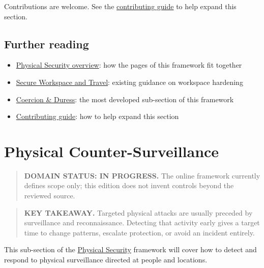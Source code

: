 Contributions are welcome. See the \href{https://frameworks.securityalliance.dev/contribute/contributing}{contributing guide} to help expand this section.

\section{Further reading}\label{further-reading-5}

\begin{itemize}
\tightlist
\item
  \href{https://frameworks.securityalliance.dev/physical-security/overview}{Physical Security overview}: how the pages of this framework fit together
\item
  \href{https://frameworks.securityalliance.dev/opsec/control-domains/physical-environmental/secure-workspace-travel}{Secure Workspace and Travel}: existing guidance on workspace hardening
\item
  \href{https://frameworks.securityalliance.dev/physical-security/coercion-and-duress/overview}{Coercion \& Duress}: the most developed sub-section of this framework
\item
  \href{https://frameworks.securityalliance.dev/contribute/contributing}{Contributing guide}: how to help expand this section
\end{itemize}

\chapter{Physical Counter-Surveillance}\label{physical-counter-surveillance}

\begin{quote}
\textbf{DOMAIN STATUS: IN PROGRESS.} The online framework currently defines scope only; this edition does not invent controls beyond the reviewed source.
\end{quote}

\begin{quote}
\textbf{KEY TAKEAWAY.} Targeted physical attacks are usually preceded by surveillance and reconnaissance. Detecting that activity early gives a target time to change patterns, escalate protection, or avoid an incident entirely.
\end{quote}

This sub-section of the \href{https://frameworks.securityalliance.dev/physical-security/overview}{Physical Security} framework will cover how to detect and respond to physical surveillance directed at people and locations.

